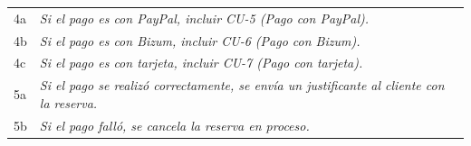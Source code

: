         \begin{table}[h!]
            \centering
            \begin{tabular}{|p{0.6cm}|p{13.4cm}|}
            \rowcolor{lightgray}
            \hline
            \multicolumn{2}{|l|}{Cursos Alternos} \\
            \hline
            4a & \color[HTML]{808080}\textit{Si el pago es con PayPal, incluir CU-5 (Pago con PayPal).} \\
            \hline
            4b & \color[HTML]{808080}\textit{Si el pago es con Bizum, incluir CU-6 (Pago con Bizum).} \\
            \hline
            4c & \color[HTML]{808080}\textit{Si el pago es con tarjeta, incluir CU-7 (Pago con tarjeta).} \\
            \hline
            5a & \color[HTML]{808080}\textit{Si el pago se realizó correctamente, se envía un justificante al cliente con la reserva.} \\
            \hline
            5b & \color[HTML]{808080}\textit{Si el pago falló, se cancela la reserva en proceso.} \\
            \hline
            \end{tabular}
            \end{table}
            

